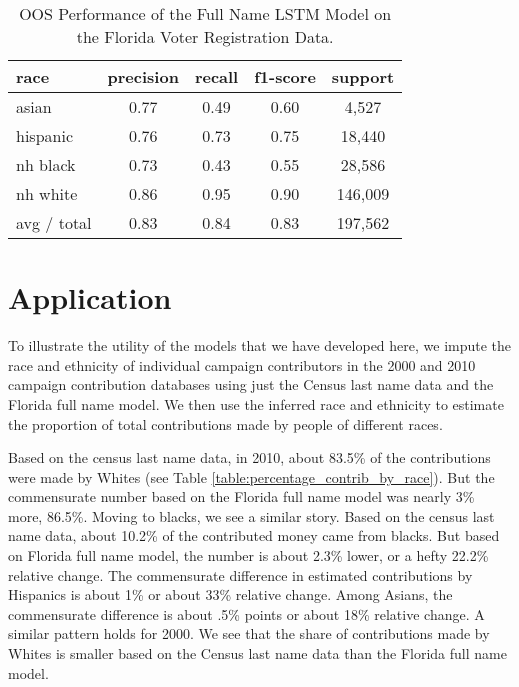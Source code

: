 \documentclass[12pt, letterpaper]{article}
\begin{document}
\begin{table}[h!]
\centering
\caption{OOS Performance of the Full Name LSTM Model on the Florida Voter Registration Data.}
\begin{tabular}{ l c c c c }
\hline    
   race & precision & recall & f1-score & support\\
\hline
      asian &        0.77 &       0.49 &       0.60 &       4,527\\
   hispanic &        0.76 &       0.73 &       0.75 &      18,440\\
   nh black &        0.73 &       0.43 &       0.55 &      28,586\\
   nh white &        0.86 &       0.95 &       0.90 &     146,009\\

avg / total &        0.83 &       0.84 &       0.83 &     197,562\\
\hline
\end{tabular}
\label{table:full_name_fl_voter_reg}
\end{table}

\section*{Application}
To illustrate the utility of the models that we have developed here, we impute the race and ethnicity of individual campaign contributors in the 2000 and 2010 campaign contribution databases \citep{bonica2017database} using just the Census last name data and the Florida full name model. We then use the inferred race and ethnicity to estimate the proportion of total contributions made by people of different races. 

Based on the census last name data, in 2010, about 83.5\% of the contributions were made by Whites (see Table \ref{table:percentage_contrib_by_race}). But the commensurate number based on the Florida full name model was nearly 3\% more, 86.5\%. Moving to blacks, we see a similar story. Based on the census last name data, about 10.2\% of the contributed money came from blacks. But based on Florida full name model, the number is about 2.3\% lower, or a hefty 22.2\% relative change. The commensurate difference in estimated contributions by Hispanics is about 1\% or about 33\% relative change. Among Asians, the commensurate difference is about .5\% points or about 18\% relative change. A similar pattern holds for 2000. We see that the share of contributions made by Whites is smaller based on the Census last name data than the Florida full name model.
\end{document}
